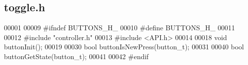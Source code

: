 \subsection{toggle.\+h}
\label{toggle_8h_source}

\begin{DoxyCode}
00001 
00009 \textcolor{preprocessor}{#ifndef BUTTONS\_H\_}
00010 \textcolor{preprocessor}{#define BUTTONS\_H\_}
00011 
00012 \textcolor{preprocessor}{#include "controller.h"}
00013 \textcolor{preprocessor}{#include <API.h>}
00014 
00018 \textcolor{keywordtype}{void} buttonInit();
00019 
00030 \textcolor{keywordtype}{bool} buttonIsNewPress(button_t);
00031 
00040 \textcolor{keywordtype}{bool} buttonGetState(button_t);
00041 
00042 \textcolor{preprocessor}{#endif}
\end{DoxyCode}
